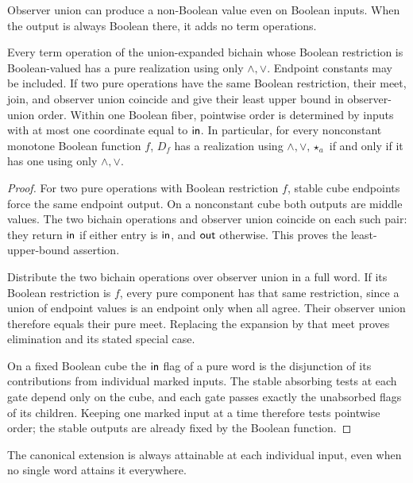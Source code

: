 Observer union can produce a non-Boolean value even on Boolean inputs.
When the output is always Boolean there, it adds no term operations.

\begin{lemma}
\label{core:lem:essential-extension-pure}
Every term operation of the union-expanded bichain whose Boolean restriction
is Boolean-valued has a pure realization using only $\wedge,\vee$.
Endpoint constants may be included. If two pure operations have the same
Boolean restriction, their meet, join, and observer union coincide and
give their least upper bound in observer-union order.
Within one Boolean fiber, pointwise order is determined by inputs with
at most one coordinate equal to $\mathsf{in}$.
In particular, for every nonconstant monotone Boolean function $f$,
$D_f$ has a realization using $\wedge,\vee,\star_a$ if and only if it
has one using only $\wedge,\vee$.
\end{lemma}
\begin{proof}
For two pure operations with Boolean restriction $f$, stable cube endpoints
force the same endpoint output. On a nonconstant cube both outputs are
middle values. The two bichain operations and observer union coincide
on each such pair: they return $\mathsf{in}$ if either entry is $\mathsf{in}$, and
$\mathsf{out}$ otherwise. This proves the least-upper-bound assertion.

Distribute the two bichain operations over observer union in a full word.
If its Boolean restriction is $f$, every pure component has that same
restriction, since a union of endpoint values is an endpoint only when
all agree. Their observer union therefore equals their pure meet.
Replacing the expansion by that meet proves elimination and its stated
special case.

On a fixed Boolean cube the $\mathsf{in}$ flag of a pure word is the disjunction
of its contributions from individual marked inputs. The stable absorbing
tests at each gate depend only on the cube, and each gate passes exactly
the unabsorbed flags of its children. Keeping one marked input at a time
therefore tests pointwise order; the stable outputs are already fixed by
the Boolean function.
\end{proof}

The canonical extension is always attainable at each individual input,
even when no single word attains it everywhere.

